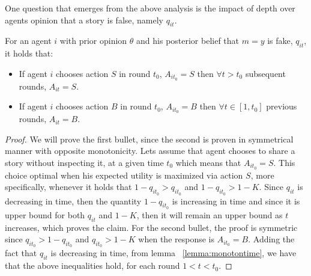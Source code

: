 One question that emerges from the above analysis is the impact of depth over agents opinion that a story is false, namely $q_{it}$.

\begin{corollary}
	For an agent $i$ with prior opinion $\theta$ and his posterior belief that $m=y$ is fake, $q_{it}$, it holds that:
	\begin{itemize}
		\item If agent $i$ chooses action $S$ in round $t_0$, $A_{it_0} = S$ then $\forall t>t_0$ subsequent rounds, $A_{it}=S$.
		\item If agent $i$ chooses action $B$ in round $t_0$, $A_{it_0} = B$ then $\forall t \in [1,t_0]$ previous rounds, $A_{it}=B$.
	\end{itemize}
	\label{cor:SBBOUNDS}
\end{corollary}

\begin{proof}
	We will prove the first bullet, since the second is proven in symmetrical manner with opposite monotonicity. Lets assume that agent chooses to share a story without inspecting it, at a given time $t_0$ which means that $A_{it_0}=S$. This choice optimal when his expected utility is maximized via action $S$, more specifically, whenever it holds that $1-q_{it_0}>q_{it_0}$ and $1-q_{it_0}>1-K$. Since $q_{it}$ is decreasing in time, then the quantity $1-q_{it_0}$ is increasing in time and since it is upper bound for both $q_{it}$ and $1-K$, then it will remain an upper bound as $t$ increases, which proves the claim. For the second bullet, the proof is symmetric since $q_{it_0}>1-q_{it_0}$ and $q_{it_0}>1-K$ when the response is $A_{it_0}=B$. Adding the fact that $q_{it}$ is decreasing in time, from lemma ~\ref{lemma:monotontime}, we have that the above inequalities hold, for each round $1<t<t_0$.
\end{proof}

